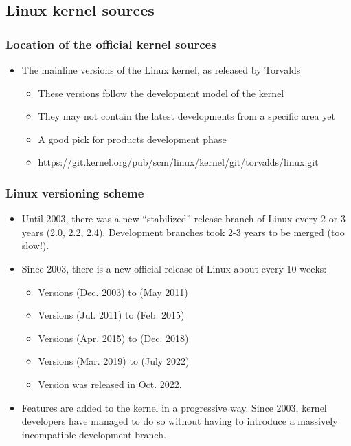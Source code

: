 \subsection{Linux kernel sources}

\begin{frame}
  \frametitle{Location of the official kernel sources}
  \begin{itemize}
  \item The mainline versions of the Linux kernel, as released by Torvalds
    \begin{itemize}
    \item These versions follow the development model of the kernel
    \item They may not contain the latest developments from a specific
      area yet
    \item A good pick for products development phase
    \item \url{https://git.kernel.org/pub/scm/linux/kernel/git/torvalds/linux.git}
    \end{itemize}
  \end{itemize}
\end{frame}

\begin{frame}
  \frametitle{Linux versioning scheme}
  \begin{itemize}
  \item Until 2003, there was a new ``stabilized'' release branch of Linux every
        2 or 3 years (2.0, 2.2, 2.4). Development branches took 2-3
        years to be merged (too slow!).
  \item Since 2003, there is a new official release of Linux about every
	10 weeks:
  \begin{itemize}
	\item Versions  (Dec. 2003) to  (May 2011)
	\item Versions  (Jul. 2011) to  (Feb. 2015)
	\item Versions  (Apr. 2015) to  (Dec. 2018)
	\item Versions  (Mar. 2019) to  (July 2022)
	\item Version  was released in Oct. 2022.
  \end{itemize}
  \item Features are added to the kernel in a progressive way. Since
        2003, kernel developers have managed to do so without having
        to introduce a massively incompatible development branch.
  \end{itemize}
\end{frame}

